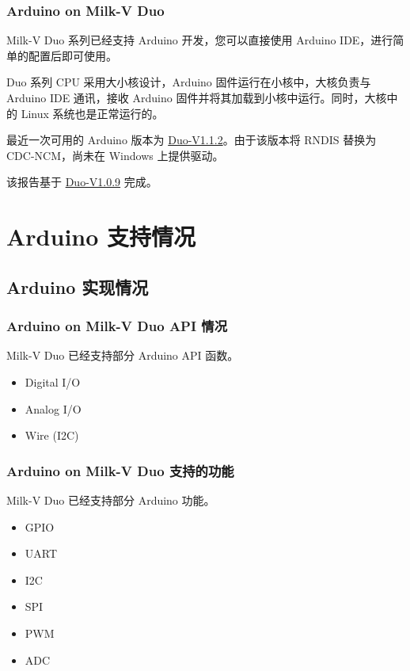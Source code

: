 \documentclass[xcolor=table,dvipsnames,svgnames,aspectratio=169]{ctexbeamer}
\begin{document}
\begin{frame}
  \frametitle{Arduino on Milk-V Duo}

  Milk-V Duo 系列已经支持 Arduino 开发，您可以直接使用 Arduino IDE，进行简单的配置后即可使用。

  Duo 系列 CPU 采用大小核设计，Arduino 固件运行在小核中，大核负责与 Arduino IDE 通讯，接收 Arduino 固件并将其加载到小核中运行。同时，大核中的 Linux 系统也是正常运行的。

  最近一次可用的 Arduino 版本为 \href{https://github.com/milkv-duo/duo-buildroot-sdk/releases/tag/Duo-V1.1.2}{Duo-V1.1.2}。由于该版本将 RNDIS 替换为 CDC-NCM，尚未在 Windows 上提供驱动。

  该报告基于 \href{https://github.com/milkv-duo/duo-buildroot-sdk/releases/tag/Duo-V1.0.9}{Duo-V1.0.9} 完成。
\end{frame}

\section{Arduino 支持情况}

\subsection{Arduino 实现情况}

\begin{frame}
  \frametitle{Arduino on Milk-V Duo API 情况}

  Milk-V Duo 已经支持部分 Arduino API 函数。

  \begin{itemize}
    \item Digital I/O
    \item Analog I/O
    \item Wire (I2C)
  \end{itemize}

\end{frame}

\begin{frame}
  \frametitle{Arduino on Milk-V Duo 支持的功能}

  Milk-V Duo 已经支持部分 Arduino 功能。

  \begin{itemize}
    \item GPIO
    \item UART
    \item I2C
    \item SPI
    \item PWM
    \item ADC
  \end{itemize}

\end{frame}
\end{document}
